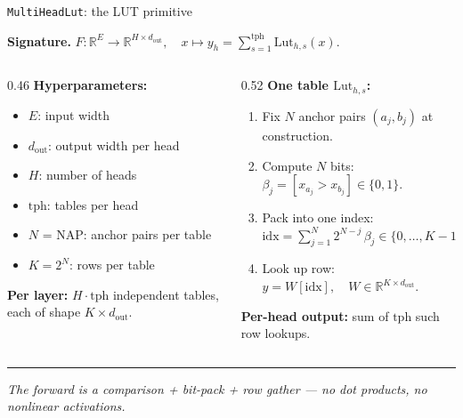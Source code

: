 \documentclass[aspectratio=169]{beamer}
\newcommand{\R}{\mathbb{R}}
\newcommand{\dout}{d_{\mathrm{out}}}
\begin{document}
\begin{frame}{\texttt{MultiHeadLut}: the LUT primitive}

\textbf{Signature.} \hspace{0.5em}
\(F : \R^{E} \to \R^{H \times \dout}, \quad x \mapsto y_h = \displaystyle\sum_{s=1}^{\mathrm{tph}} \mathrm{Lut}_{h,s}(x).\)

\medskip
\begin{columns}[T,onlytextwidth]
\begin{column}{0.46\textwidth}
\textbf{Hyperparameters:}
\begin{itemize}
\item \(E\): input width
\item \(\dout\): output width per head
\item \(H\): number of heads
\item \(\mathrm{tph}\): tables per head
\item \(N\) = NAP: anchor pairs per table
\item \(K = 2^N\): rows per table
\end{itemize}

\medskip
\textbf{Per layer:} \(H \cdot \mathrm{tph}\) independent tables, each of shape \(K \times \dout\).
\end{column}
\begin{column}{0.52\textwidth}
\textbf{One table \(\mathrm{Lut}_{h,s}\):}
\begin{enumerate}
\item Fix \(N\) anchor pairs \((a_j, b_j)\) at construction.
\item Compute \(N\) bits: \(\beta_j = [x_{a_j} > x_{b_j}] \in \{0, 1\}.\)
\item Pack into one index: \(\mathrm{idx} = \sum_{j=1}^{N} 2^{N-j}\, \beta_j \in \{0, \dots, K{-}1\}.\)
\item Look up row: \(y = W[\mathrm{idx}],\quad W \in \R^{K \times \dout}.\)
\end{enumerate}

\medskip
\textbf{Per-head output:} sum of \(\mathrm{tph}\) such row lookups.
\end{column}
\end{columns}

\vspace{0.6em}
\hrule
\vspace{0.4em}
\small\emph{The forward is a comparison + bit-pack + row gather --- no dot products, no nonlinear activations.}
\end{frame}
\end{document}
